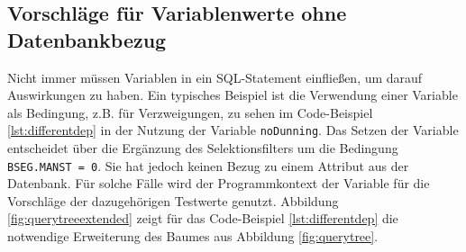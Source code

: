 %
%
%

%

\subsection{Vorschläge für Variablenwerte ohne Datenbankbezug}
Nicht immer müssen Variablen in ein SQL-Statement einfließen, um darauf Auswirkungen zu haben.
Ein typisches Beispiel ist die Verwendung einer Variable als Bedingung, z.B. für Verzweigungen, zu sehen im Code-Beispiel \ref{lst:differentdep} in der Nutzung der Variable \texttt{noDunning}.
Das Setzen der Variable entscheidet über die Ergänzung des Selektionsfilters um die Bedingung \texttt{BSEG.MANST = 0}.
Sie hat jedoch keinen Bezug zu einem Attribut aus der Datenbank.
Für solche Fälle wird der Programmkontext der Variable für die Vorschläge der dazugehörigen Testwerte genutzt.
Abbildung \ref{fig:querytreeextended} zeigt für das Code-Beispiel \ref{lst:differentdep} die notwendige Erweiterung des Baumes aus Abbildung \ref{fig:querytree}.

